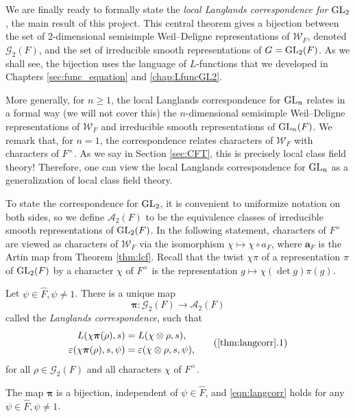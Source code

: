 We are finally ready to formally state the \textit{local Langlands correspondence for $\mathrm{GL}_2$}, the main result of this project. This central theorem gives a bijection between the set of $2$-dimensional semisimple Weil--Deligne representations of $\mathcal{W}_F$, denoted $\mathcal{G}_2(F)$, and the set of irreducible smooth representations of $G=\mathrm{GL}_2(F)$. As we shall see, the bijection uses the language of $L$-functions that we developed in Chapters \ref{sec:func_equation} and \ref{chap:LfuncGL2}. 

More generally, for $n\geq 1$, the local Langlands correspondence for $\mathrm{GL}_n$ relates in a formal way (we will not cover this) the $n$-dimensional semisimple Weil--Deligne representations of $\mathcal{W}_F$ and irreducible smooth representations of $\mathrm{GL}_n(F)$. We remark that, for $n=1$, the correspondence relates characters of $\mathcal{W}_F$ with characters of $F^\times$. As we say in Section \ref{sec:CFT}, this is precisely local class field theory! Therefore, one can view the local Langlands correspondence for $\mathrm{GL}_n$ as a generalization of local class field theory.

To state the correspondence for $\mathrm{GL}_2$, it is convenient to uniformize notation on both sides, so we define $\mathcal{A}_2(F)$ to be the equivalence classes of irreducible smooth representations of $\mathrm{GL}_2(F)$. In the following statement, characters of $F^\times$ are viewed as characters of $\mathcal{W}_F$ via the isomorphism $\chi\mapsto\chi\circ a_F$, where $\mathbf{a}_F$ is the Artin map from Theorem \ref{thm:lcf}. Recall that the twist $\chi\pi$ of a representation $\pi$ of $\mathrm{GL}_2(F)$ by a character $\chi$ of $F^\times$ is the representation $g\mapsto \chi(\det g)\pi(g)$.


\begin{thm}\label{thm:langcorr}
    Let $\psi\in\hat{F},\psi\neq 1$. There is a unique map 
    $$\bm\pi:\mathcal{G}_2(F)\longrightarrow\mathcal{A}_2(F)$$
    called the \textit{Langlands correspondence}, such that 
    \begin{equation}
        \begin{split}
            L(\chi\bm\pi(\rho),s)&=L(\chi\otimes\rho,s),\\
            \varepsilon(\chi\bm\pi(\rho),s,\psi)&=\varepsilon(\chi\otimes\rho,s,\psi),
        \end{split}
        \label{eqn:langcorr}\tag{\ref{thm:langcorr}.1}
    \end{equation}
    for all $\rho\in\mathcal{G}_2(F)$ and all characters $\chi$ of $F^\times$.

    The map $\bm\pi$ is a bijection, independent of $\psi\in\hat{F}$, and \eqref{eqn:langcorr} holds for any $\psi\in\hat{F}, \psi\neq1$.
\end{thm}

